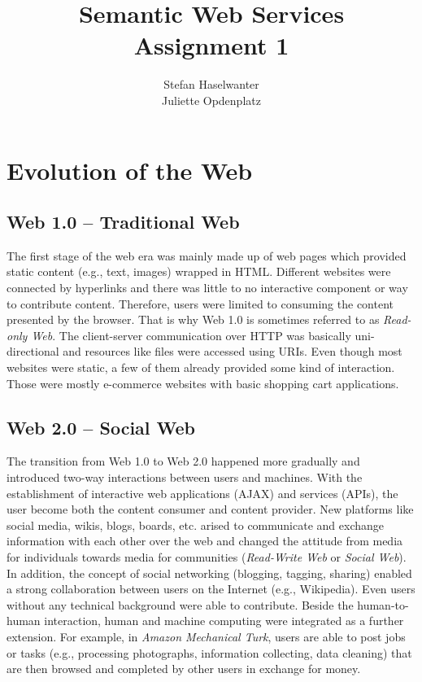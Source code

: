 \documentclass[a4paper]{article}
\title{\textbf{Semantic Web Services}\\\large{Assignment 1}}
\author{Stefan Haselwanter\\Juliette Opdenplatz}
\begin{document}
\maketitle


\section{Evolution of the Web}

\subsection*{Web 1.0 -- Traditional Web}
The first stage of the web era was mainly made up of web pages which provided static content (e.g., text, images) wrapped in HTML.
Different websites were connected by hyperlinks and there was little to no interactive component or way to contribute content.
Therefore, users were limited to consuming the content presented by the browser.
That is why Web 1.0 is sometimes referred to as \emph{Read-only Web}.
The client-server communication over HTTP was basically uni-directional and resources like files were accessed using URIs.
Even though most websites were static, a few of them already provided some kind of interaction.
Those were mostly e-commerce websites with basic shopping cart applications.

\subsection*{Web 2.0 -- Social Web}
The transition from Web 1.0 to Web 2.0 happened more gradually and introduced two-way interactions between users and machines.
With the establishment of interactive web applications (AJAX) and services (APIs), the user become both the content consumer and content provider.
New platforms like social media, wikis, blogs, boards, etc. arised to communicate and exchange information with each other over the web and changed the attitude from media for individuals towards media for communities (\emph{Read-Write Web} or \emph{Social Web}).
In addition, the concept of social networking (blogging, tagging, sharing) enabled a strong collaboration between users on the Internet (e.g., Wikipedia).
Even users without any technical background were able to contribute.
Beside the human-to-human interaction, human and machine computing were integrated as a further extension.
For example, in \emph{Amazon Mechanical Turk}, users are able to post jobs or tasks (e.g., processing photographs, information collecting, data cleaning) that are then browsed and completed by other users in exchange for money.
\end{document}
